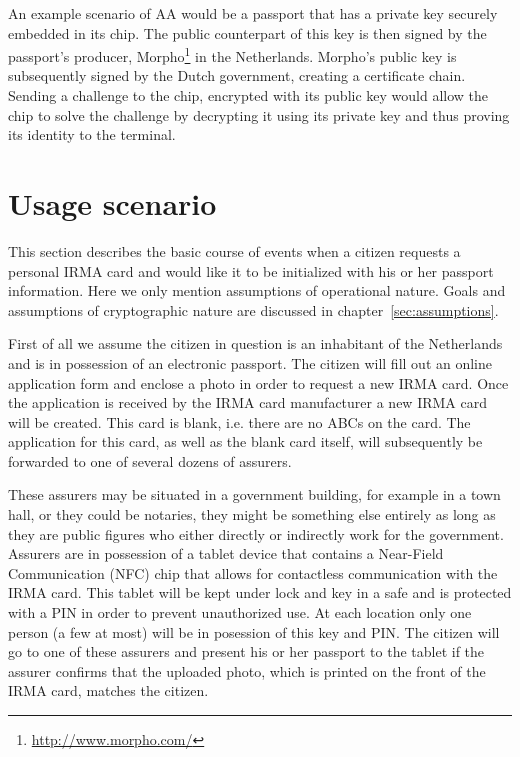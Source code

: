 An example scenario of AA would be a passport that has a private key securely embedded in its chip. The public counterpart of this key is then signed by the passport's producer, Morpho\footnote{\url{http://www.morpho.com/}} in the Netherlands. Morpho's public key is subsequently signed by the Dutch government, creating a certificate chain. Sending a challenge to the chip, encrypted with its public key would allow the chip to solve the challenge by decrypting it using its private key and thus proving its identity to the terminal.

\section{Usage scenario}
\label{subsec:bcoe}
This section describes the basic course of events when a citizen requests a personal IRMA card and would like it to be initialized with his or her passport information. Here we only mention assumptions of operational nature. Goals and assumptions of cryptographic nature are discussed in chapter~\ref{sec:assumptions}. 

First of all we assume the citizen in question is an inhabitant of the Netherlands and is in possession of an electronic passport. The citizen will fill out an online application form and enclose a photo in order to request a new IRMA card. Once the application is received by the IRMA card manufacturer a new IRMA card will be created. This card is blank, i.e. there are no ABCs on the card. The application for this card, as well as the blank card itself, will subsequently be forwarded to one of several dozens of assurers. 

These assurers may be situated in a government building, for example in a town hall, or they could be notaries, they might be something else entirely as long as they are public figures who either directly or indirectly work for the government. Assurers are in possession of a tablet device that contains a Near-Field Communication (NFC) chip that allows for contactless communication with the IRMA card. This tablet will be kept under lock and key in a safe and is protected with a PIN in order to prevent unauthorized use. At each location only one person (a few at most) will be in posession of this key and PIN. The citizen will go to one of these assurers and present his or her passport to the tablet if the assurer confirms that the uploaded photo, which is printed on the front of the IRMA card, matches the citizen. 

